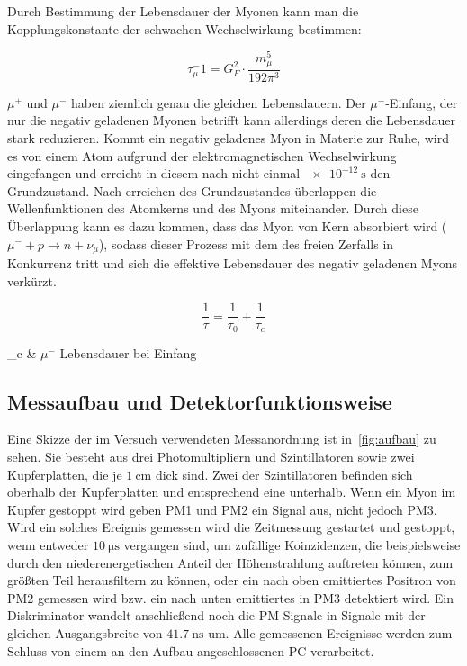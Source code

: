 \documentclass[slug=LM, room=Andreas-Schubert-Bau\,\ K\ 1A, supervisor=Anne-Sophie\ Berthold, coursedate=13.\ 12.\ 2019]{../../Lab_Report_LaTeX/lab_report}
\begin{document}
Durch Bestimmung der Lebensdauer der Myonen kann man die Kopplungskonstante der schwachen
Wechselwirkung bestimmen:

\begin{equation} \label{eq:kopplkonst}
        \tau_\mu^-1 = G_F^2 \cdot \frac{m_\mu^5}{192 \pi^3}
\end{equation}

\(\mu^+\) und \(\mu^-\) haben ziemlich genau die gleichen Lebensdauern.
Der \(\mu^-\)-Einfang, der nur die negativ geladenen Myonen betrifft kann allerdings deren
die Lebensdauer stark reduzieren.
Kommt ein negativ geladenes Myon in Materie zur Ruhe, wird es von einem Atom aufgrund der
elektromagnetischen Wechselwirkung eingefangen und erreicht in diesem nach nicht einmal
\(\SI{e-12}{\second}\) den Grundzustand. Nach erreichen des Grundzustandes überlappen die
Wellenfunktionen des Atomkerns und des Myons miteinander. Durch diese Überlappung kann es dazu
kommen, dass das Myon von Kern absorbiert wird (\(\mu^- + p \rightarrow n + \nu_\mu\)), sodass
dieser Prozess mit dem des freien Zerfalls in Konkurrenz tritt und sich die effektive Lebensdauer
des negativ geladenen Myons verkürzt.

\begin{equation}\label{eq:efflebenszeit}
        \frac{1}{\tau} = \frac{1}{\tau_0} + \frac{1}{\tau_c}
\end{equation}

\begin{conditions}
        \tau_c & \(\mu^-\) Lebensdauer bei Einfang
\end{conditions}

\subsection{Messaufbau und Detektorfunktionsweise}
\label{sec:aufbau}

Eine Skizze der im Versuch verwendeten Messanordnung ist in~\ref*{fig:aufbau} zu sehen.
Sie besteht aus drei Photomultipliern und Szintillatoren sowie zwei Kupferplatten, die je
\(\SI{1}{\centi\metre}\) dick sind. Zwei der Szintillatoren befinden sich oberhalb der Kupferplatten
und entsprechend eine unterhalb.
Wenn ein Myon im Kupfer gestoppt wird geben PM1 und PM2 ein Signal aus, nicht jedoch PM3. Wird ein
solches Ereignis gemessen wird die Zeitmessung gestartet und gestoppt, wenn entweder
\(\SI{10}{\micro\second}\) vergangen sind, um zufällige Koinzidenzen, die beispielsweise durch
den niederenergetischen Anteil der Höhenstrahlung auftreten können, zum größten Teil
herausfiltern zu können, oder
ein nach oben emittiertes Positron von PM2 gemessen wird bzw. ein nach unten emittiertes in
PM3 detektiert wird. Ein Diskriminator wandelt anschließend noch die PM-Signale in Signale mit der
gleichen Ausgangsbreite von \(\SI{41,7}{\nano\second}\) um. Alle gemessenen Ereignisse werden
zum Schluss von einem an den Aufbau angeschlossenen PC verarbeitet.
\end{document}
